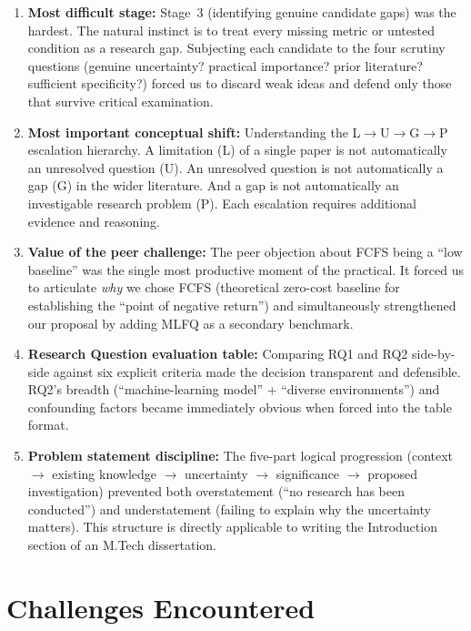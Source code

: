\documentclass[11pt, a4paper]{article}
\begin{document}
\begin{enumerate}[nosep]
    \item \textbf{Most difficult stage:} Stage~3 (identifying genuine candidate gaps) was the hardest. The natural instinct is to treat every missing metric or untested condition as a research gap. Subjecting each candidate to the four scrutiny questions (genuine uncertainty? practical importance? prior literature? sufficient specificity?) forced us to discard weak ideas and defend only those that survive critical examination.

    \item \textbf{Most important conceptual shift:} Understanding the L$\to$U$\to$G$\to$P escalation hierarchy. A limitation (L) of a single paper is not automatically an unresolved question (U). An unresolved question is not automatically a gap (G) in the wider literature. And a gap is not automatically an investigable research problem (P). Each escalation requires additional evidence and reasoning.

    \item \textbf{Value of the peer challenge:} The peer objection about FCFS being a ``low baseline'' was the single most productive moment of the practical. It forced us to articulate \emph{why} we chose FCFS (theoretical zero-cost baseline for establishing the ``point of negative return'') and simultaneously strengthened our proposal by adding MLFQ as a secondary benchmark.

    \item \textbf{Research Question evaluation table:} Comparing RQ1 and RQ2 side-by-side against six explicit criteria made the decision transparent and defensible. RQ2's breadth (``machine-learning model'' + ``diverse environments'') and confounding factors became immediately obvious when forced into the table format.

    \item \textbf{Problem statement discipline:} The five-part logical progression (context $\to$ existing knowledge $\to$ uncertainty $\to$ significance $\to$ proposed investigation) prevented both overstatement (``no research has been conducted'') and understatement (failing to explain why the uncertainty matters). This structure is directly applicable to writing the Introduction section of an M.Tech dissertation.
\end{enumerate}

\section{Challenges Encountered}
\end{document}
